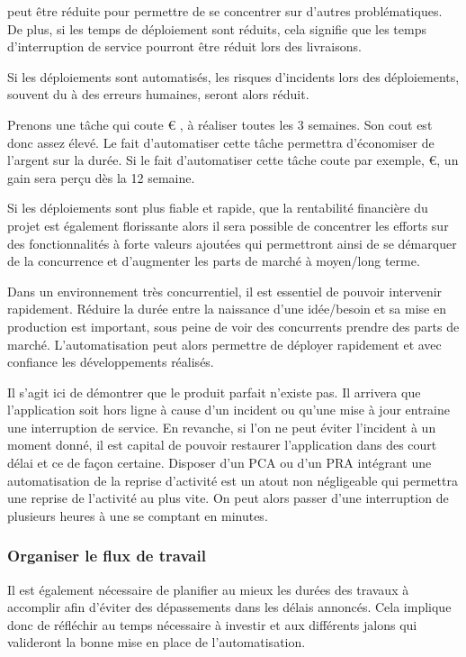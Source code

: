 \begin{description}
	\setlength\itemsep{0em}
	\item [La durée de de déploiement] peut être réduite pour permettre de se concentrer sur d'autres problématiques. De plus, si les temps de déploiement sont réduits, cela signifie que les temps d'interruption de service pourront être réduit lors des livraisons.
	\item [Erreur de déploiement] Si les déploiements sont automatisés, les risques d'incidents lors des déploiements, souvent du à des erreurs humaines, seront alors réduit.
	\item [Rentabilité financière] Prenons une tâche qui coute € , à réaliser toutes les 3 semaines. Son cout est donc assez élevé. Le fait d'automatiser cette tâche permettra d'économiser de l'argent sur la durée. Si le fait d'automatiser cette tâche coute par exemple, €, un gain sera perçu dès la 12 semaine.
	\item [Part de marché] Si les déploiements sont plus fiable et rapide, que la rentabilité financière du projet est également florissante alors il sera possible de concentrer les efforts sur des fonctionnalités à forte valeurs ajoutées qui permettront ainsi de se démarquer de la concurrence et d'augmenter les parts de marché à moyen/long terme.
	\item [\Gls{timetomarket}] Dans un environnement très concurrentiel, il est essentiel de pouvoir intervenir rapidement. Réduire la durée entre la naissance d'une idée/besoin et sa mise en production est important, sous peine de voir des concurrents prendre des parts de marché. L'automatisation peut alors permettre de déployer rapidement et avec confiance les développements réalisés.
	\item [Reprise d'activité] Il s'agit ici de démontrer que le produit parfait n'existe pas. Il arrivera que l'application soit hors ligne à cause d'un incident ou qu'une mise à jour entraine une interruption de service. En revanche, si l'on ne peut éviter l'incident à un moment donné, il est capital de pouvoir restaurer l'application dans des court délai et ce de façon certaine. Disposer d'un \gls{PCA} ou d'un \gls{PRA} intégrant une automatisation de la reprise d'activité est un atout non négligeable qui permettra une reprise de l'activité au plus vite. On peut alors passer d'une interruption de plusieurs heures à une se comptant en minutes.
\end{description}

\subsubsection{Organiser le flux de travail}
Il est également nécessaire de planifier au mieux les durées des travaux à accomplir afin d'éviter des dépassements dans les délais annoncés. Cela implique donc de réfléchir au temps nécessaire à investir et aux différents jalons qui valideront la bonne mise en place de l'automatisation. 


